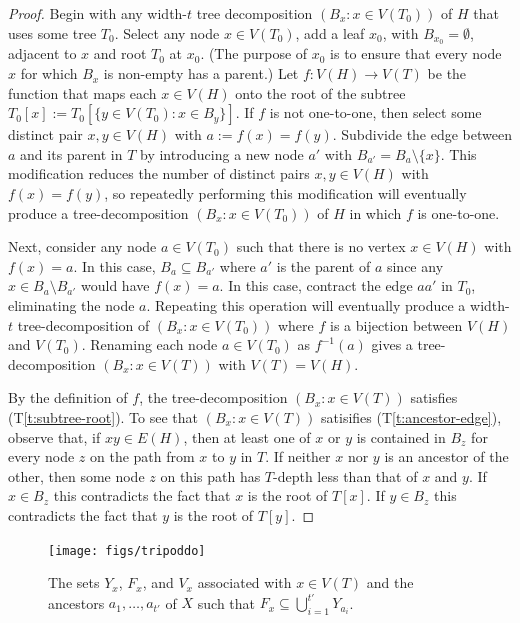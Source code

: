 \documentclass{patmorin}
\newcommand{\tref}[1]{(T\ref{t:#1})}
\begin{document}
\begin{proof}
  Begin with any width-$t$ tree decomposition $(B_x:x\in V(T_0))$ of $H$ that uses some tree $T_0$.  Select any node $x\in V(T_0)$, add a leaf $x_0$, with $B_{x_0}=\emptyset$, adjacent to $x$ and root $T_0$ at $x_0$. (The purpose of $x_0$ is to ensure that every node $x$ for which $B_x$ is non-empty has a parent.)  Let $f:V(H)\to V(T)$ be the function that maps each $x\in V(H)$ onto the root of the subtree $T_0[x]:=T_0[\{y\in V(T_0): x\in B_y\}]$.  If $f$ is not one-to-one, then select some distinct pair $x,y\in V(H)$ with $a:=f(x)=f(y)$.  Subdivide the edge between $a$ and its parent in $T$ by introducing a new node $a'$ with $B_{a'}=B_{a}\setminus\{x\}$.  This modification reduces the number of distinct pairs $x,y\in V(H)$ with $f(x)=f(y)$, so repeatedly performing this modification will eventually produce a tree-decomposition $(B_x:x\in V(T_0))$ of $H$ in which $f$ is one-to-one.
  
  Next, consider any node $a\in V(T_0)$ such that there is no vertex $x\in V(H)$ with $f(x)=a$.  In this case, $B_{a}\subseteq B_{a'}$ where $a'$ is the parent of $a$ since any $x\in B_a\setminus B_{a'}$ would have $f(x)=a$.  In this case, contract the edge $aa'$ in $T_0$, eliminating the node $a$.  Repeating this operation will eventually produce a width-$t$ tree-decomposition of $(B_x:x\in V(T_0))$ where $f$ is a bijection between $V(H)$ and $V(T_0)$.  Renaming each node $a\in V(T_0)$ as $f^{-1}(a)$ gives a tree-decomposition $(B_x:x\in V(T))$ with $V(T)=V(H)$.  
  
  By the definition of $f$, the tree-decomposition $(B_x:x\in V(T))$ satisfies \tref{subtree-root}.  To see that $(B_x:x\in V(T))$ satisifies \tref{ancestor-edge}, observe that, if $xy\in E(H)$, then at least one of $x$ or $y$ is contained in $B_z$ for every node $z$ on the path from $x$ to $y$ in $T$.  If neither $x$ nor $y$ is an ancestor of the other, then some node $z$ on this path has $T$-depth less than that of $x$ and $y$.  If $x\in B_z$ this contradicts the fact that $x$ is the root of $T[x]$.  If $y\in B_z$ this contradicts the fact that $y$ is the root of $T[y]$.
\end{proof}



\begin{figure}[htbp]
  \begin{center}
    \texttt{[image: figs/tripoddo]}
  \end{center}
  \caption{The sets $Y_x$, $F_x$, and $V_x$ associated with $x\in V(T)$
  and the ancestors $a_1,\ldots,a_{t'}$ of $X$ such that $F_x \subseteq \bigcup_{i=1}^{t'} Y_{a_i}$.}
  \label{fig:generalized-tripod}
\end{figure}
\end{document}
